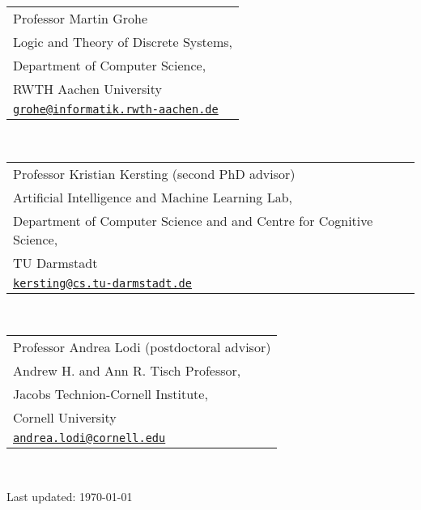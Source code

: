 \documentclass[11pt, a4paper, DIV=14, headings=small]{scrartcl}
\begin{document}
	
	\begin{tabular}{l}
		Professor Martin Grohe                                                    \\
		Logic and Theory of Discrete Systems,                                                   \\
		Department of Computer Science,                                                         \\
		RWTH Aachen University                                                                  \\
		\href{mailto:grohe@informatik.rwth-aachen.de}{\texttt{grohe@informatik.rwth-aachen.de}} \\
	\end{tabular}\\[0.5em]
	
	\begin{tabular}{l}
		Professor Kristian Kersting (second PhD advisor)                                \\
		Artificial Intelligence and Machine Learning Lab,                               \\
		Department of Computer Science and and Centre for Cognitive Science,            \\
		TU Darmstadt                                                                    \\
		\href{mailto:kersting@cs.tu-darmstadt.de}{\texttt{kersting@cs.tu-darmstadt.de}} \\
	\end{tabular}\\[0.5em]
	
	\begin{tabular}{l}
		Professor Andrea Lodi (postdoctoral advisor)                            \\
		Andrew H. and Ann R. Tisch Professor,                                   \\
		Jacobs Technion-Cornell Institute,                                      \\
		Cornell University                                                      \\
		\href{mailto:andrea.lodi@cornell.edu}{\texttt{andrea.lodi@cornell.edu}} \\
	\end{tabular}\\[0.5em]
		
	\vfill{}
	\begin{center}
		{\scriptsize Last updated: \today}
	\end{center}	
\end{document}
